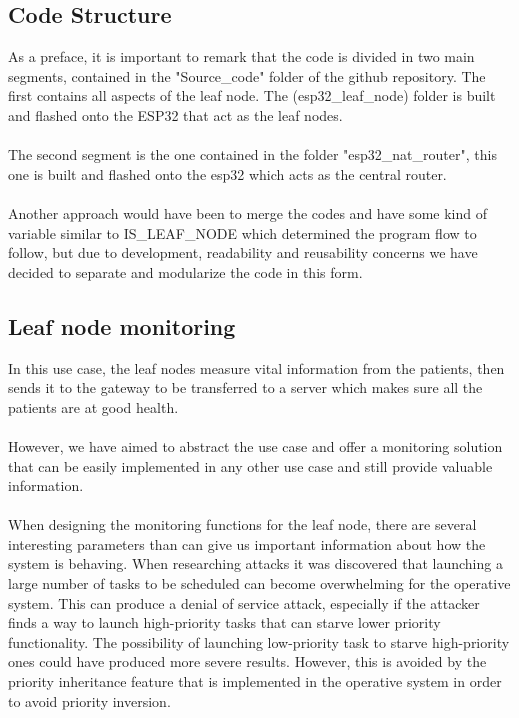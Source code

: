 \subsection{Code Structure}
As a preface, it is important to remark that the code is divided in two main segments, contained in the "Source\_code" folder of the github repository. The first contains all aspects of the leaf node. The (esp32\_leaf\_node) folder is built and flashed onto the ESP32 that act as the leaf nodes.
\\~\\
The second segment is the one contained in the folder "esp32\_nat\_router", this one is built and flashed onto the esp32 which acts as the central router.
\\~\\
Another approach would have been to merge the codes and have some kind of variable similar to IS\_LEAF\_NODE which determined the program flow to follow, but due to development, readability and reusability concerns we have decided to separate and modularize the code in this form.


\subsection{Leaf node monitoring}
In this use case, the leaf nodes measure vital information from the patients, then sends it to the gateway to be transferred to a server which makes sure all the patients are at good health.
\\~\\
However, we have aimed to abstract the use case and offer a monitoring solution that can be easily implemented in any other use case and still provide valuable information.
\\~\\
When designing the monitoring functions for the leaf node, there are several interesting parameters than can give us important information about how the system is behaving. When researching attacks it was discovered that launching a large number of tasks to be scheduled can become overwhelming for the operative system. This can produce a denial of service attack, especially if the attacker finds a way to launch high-priority tasks that can starve lower priority functionality. The possibility of launching low-priority task to starve high-priority ones could have produced more severe results. However, this is avoided by the priority inheritance feature that is implemented in the operative system in order to avoid priority inversion. \\

